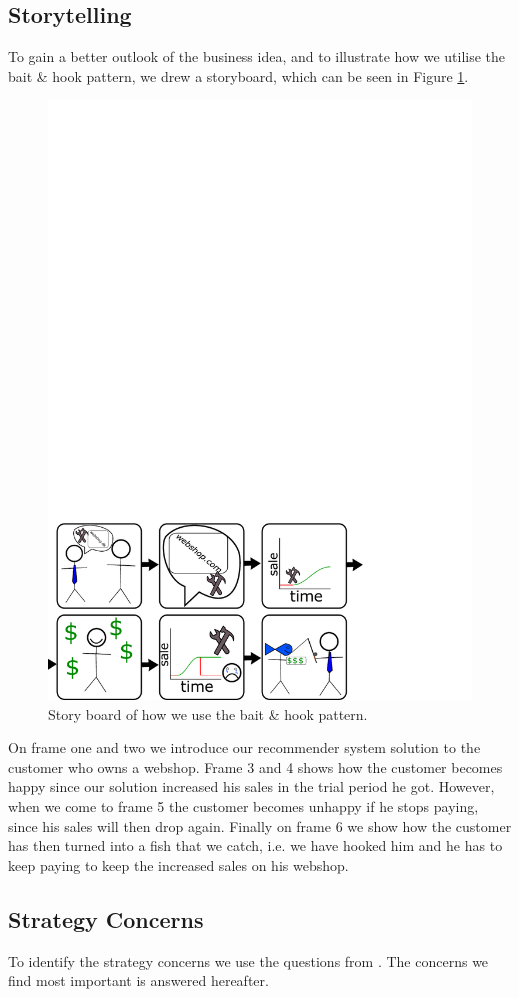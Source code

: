 \subsection{Storytelling}
To gain a better outlook of the business idea, and to illustrate how we utilise the bait \& hook pattern, we drew a storyboard, which can be seen in Figure \cref{fig:drawing}.

\begin{figure}
	\centering
	\includegraphics[width=0.7\linewidth]{figures/drawing}
	\caption{Story board of how we use the bait \& hook pattern.}
	\label{fig:drawing}
\end{figure}
 
 On frame one and two we introduce our recommender system solution to the customer who owns a webshop.
 Frame 3 and 4 shows how the customer becomes happy since our solution increased his sales in the trial period he got.
 However, when we come to frame 5 the customer becomes unhappy if he stops paying, since his sales will then drop again.
 Finally on frame 6 we show how the customer has then turned into a fish that we catch, i.e. we have hooked him and he has to keep paying to keep the increased sales on his webshop.
 
\subsection{Strategy Concerns}
To identify the strategy concerns we use the questions from \citep[pg. 202-208]{osterwalder2010business}.
The concerns we find most important is answered hereafter.

